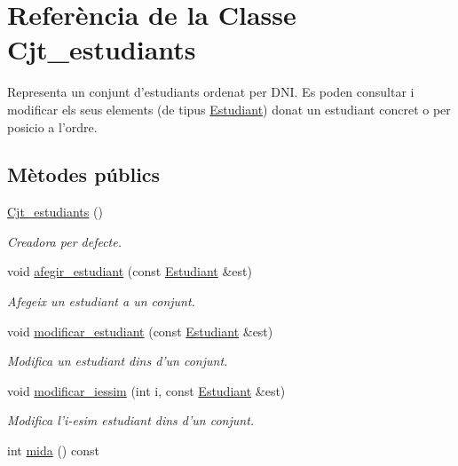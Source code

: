 \hypertarget{class_cjt__estudiants}{\section{Referència de la Classe Cjt\+\_\+estudiants}
\label{class_cjt__estudiants}
}


Representa un conjunt d'estudiants ordenat per D\+N\+I. Es poden consultar i modificar els seus elements (de tipus \hyperlink{class_estudiant}{Estudiant}) donat un estudiant concret o per posicio a l'ordre.  


\subsection*{Mètodes públics}
\begin{DoxyCompactItemize}
\item 
\hyperlink{class_cjt__estudiants_a31ffe72cadcf58d82c8b9f6659c56e7a}{Cjt\+\_\+estudiants} ()
\begin{DoxyCompactList}\small\item\em Creadora per defecte. \end{DoxyCompactList}\item 
void \hyperlink{class_cjt__estudiants_a8724107ebfbe917c45906f7e6d510867}{afegir\+\_\+estudiant} (const \hyperlink{class_estudiant}{Estudiant} \&est)
\begin{DoxyCompactList}\small\item\em Afegeix un estudiant a un conjunt. \end{DoxyCompactList}\item 
void \hyperlink{class_cjt__estudiants_ae5b64b1e3ea3587e00a32e6fbeae2e7c}{modificar\+\_\+estudiant} (const \hyperlink{class_estudiant}{Estudiant} \&est)
\begin{DoxyCompactList}\small\item\em Modifica un estudiant dins d'un conjunt. \end{DoxyCompactList}\item 
void \hyperlink{class_cjt__estudiants_a18590359c8f8537aa38711febf6c8bbf}{modificar\+\_\+iessim} (int i, const \hyperlink{class_estudiant}{Estudiant} \&est)
\begin{DoxyCompactList}\small\item\em Modifica l'i-\/esim estudiant dins d'un conjunt. \end{DoxyCompactList}\item 
int \hyperlink{class_cjt__estudiants_a8b25d97f6e061b2986e18c67a0d49f73}{mida} () const 

\end{DoxyCompactItemize}
